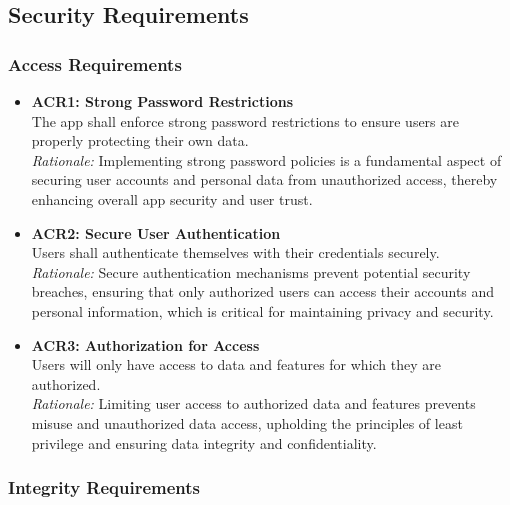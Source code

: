 \documentclass[12pt]{article}
\begin{document}
\subsection{Security Requirements}
\subsubsection{Access Requirements}

\begin{itemize}
    \item \textbf{ACR1: Strong Password Restrictions}\\
    The app shall enforce strong password restrictions to ensure users are properly protecting their own data.\\
    \textit{Rationale:} Implementing strong password policies is a fundamental aspect of securing user accounts and personal data from unauthorized access, thereby enhancing overall app security and user trust.

    \item \textbf{ACR2: Secure User Authentication}\\
    Users shall authenticate themselves with their credentials securely.\\
    \textit{Rationale:} Secure authentication mechanisms prevent potential security breaches, ensuring that only authorized users can access their accounts and personal information, which is critical for maintaining privacy and security.

    \item \textbf{ACR3: Authorization for Access}\\
    Users will only have access to data and features for which they are authorized.\\
    \textit{Rationale:} Limiting user access to authorized data and features prevents misuse and unauthorized data access, upholding the principles of least privilege and ensuring data integrity and confidentiality.
\end{itemize}


\subsubsection{Integrity Requirements}
\end{document}
